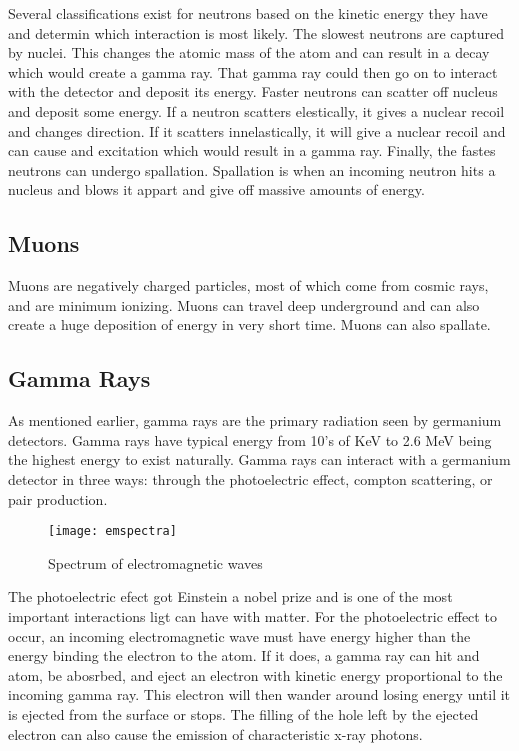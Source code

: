 Several classifications exist for neutrons based on the kinetic energy they have and determin which interaction is most likely.
The slowest neutrons are captured by nuclei.
This changes the atomic mass of the atom and can result in a decay which would create a gamma ray.
That gamma ray could then go on to interact with the detector and deposit its energy.
Faster neutrons can scatter off nucleus and deposit some energy.
If a neutron scatters elestically, it gives a nuclear recoil and changes direction.
If it scatters innelastically, it will give a nuclear recoil and can cause and excitation which would result in a gamma ray.
Finally, the fastes neutrons can undergo spallation.
Spallation is when an incoming neutron hits a nucleus and blows it appart and give off massive amounts of energy.

\subsection{Muons}
Muons are negatively charged particles, most of which come from cosmic rays, and are minimum ionizing. 
Muons can travel deep underground and can also create a huge deposition of energy in very short time.
Muons can also spallate.

\subsection{Gamma Rays}
As mentioned earlier, gamma rays are the primary radiation seen by germanium detectors.
Gamma rays have typical energy from 10's of KeV to 2.6 MeV being the highest energy to exist naturally.
Gamma rays can interact with a germanium detector in three ways: through the photoelectric effect, compton scattering, or pair production.
\begin{figure}[htpb]
\centering
\texttt{[image: emspectra]}
\caption{Spectrum of electromagnetic waves}
\label{fig:emspectra}
\end{figure}

The photoelectric efect got Einstein a nobel prize and is one of the most important interactions ligt can have with matter.
For the photoelectric effect to occur, an incoming electromagnetic wave must have energy higher than the energy binding the electron to the atom.
If it does, a gamma ray can hit and atom, be abosrbed, and eject an electron with kinetic energy proportional to the incoming gamma ray.
This electron will then wander around losing energy until it is ejected from the surface or stops.
The filling of the hole left by the ejected electron can also cause the emission of characteristic x-ray photons.

